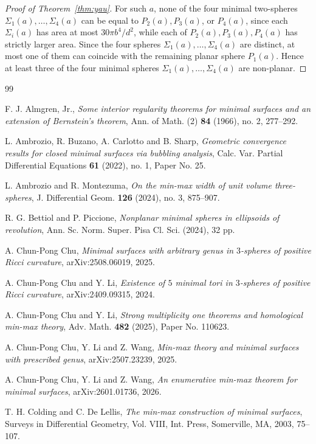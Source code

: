 \documentclass[12pt,english]{amsart}
\theoremstyle{definition}
\begin{document}
\begin{proof}[Proof of Theorem~\ref{thm:yau}]
For such \(a\), none of the four minimal two-spheres
\(\Sigma_1(a),\ldots,\Sigma_4(a)\) can be equal to \(P_2(a),P_3(a)\), or \(P_4(a)\), since each \(\Sigma_i(a)\) has area at most \(30\pi b^4/d^2\), while each of \(P_2(a),P_3(a),P_4(a)\) has strictly larger area. Since the four spheres \(\Sigma_1(a),\ldots,\Sigma_4(a)\) are distinct, at most one of them can coincide with the remaining planar sphere \(P_1(a)\). Hence at least three of the four minimal spheres \(\Sigma_1(a),\ldots,\Sigma_4(a)\) are non-planar.
\end{proof}

\begin{thebibliography}{99}

F. J. Almgren, Jr.,
\emph{Some interior regularity theorems for minimal surfaces and an extension of Bernstein's theorem},
Ann. of Math. (2) \textbf{84} (1966), no. 2, 277--292.

L. Ambrozio, R. Buzano, A. Carlotto and B. Sharp,
\emph{Geometric convergence results for closed minimal surfaces via bubbling analysis},
Calc. Var. Partial Differential Equations \textbf{61} (2022), no. 1, Paper No. 25.

L. Ambrozio and R. Montezuma,
\emph{On the min-max width of unit volume three-spheres},
J. Differential Geom. \textbf{126} (2024), no. 3, 875--907.

R. G. Bettiol and P. Piccione,
\emph{Nonplanar minimal spheres in ellipsoids of revolution},
Ann. Sc. Norm. Super. Pisa Cl. Sci. (2024), 32 pp.

A. Chun-Pong Chu,
\emph{Minimal surfaces with arbitrary genus in \(3\)-spheres of positive Ricci curvature},
arXiv:2508.06019, 2025.

A. Chun-Pong Chu and Y. Li,
\emph{Existence of \(5\) minimal tori in \(3\)-spheres of positive Ricci curvature},
arXiv:2409.09315, 2024.

A. Chun-Pong Chu and Y. Li,
\emph{Strong multiplicity one theorems and homological min-max theory},
Adv. Math. \textbf{482} (2025), Paper No. 110623.

A. Chun-Pong Chu, Y. Li and Z. Wang,
\emph{Min-max theory and minimal surfaces with prescribed genus},
arXiv:2507.23239, 2025.

A. Chun-Pong Chu, Y. Li and Z. Wang,
\emph{An enumerative min-max theorem for minimal surfaces},
arXiv:2601.01736, 2026.

T. H. Colding and C. De Lellis,
\emph{The min-max construction of minimal surfaces},
Surveys in Differential Geometry, Vol. VIII, Int. Press, Somerville, MA, 2003, 75--107.


\end{thebibliography}
\end{document}
